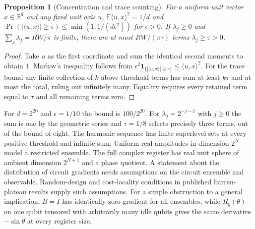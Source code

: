 \documentclass[aps,pra,onecolumn,superscriptaddress,nofootinbib,10pt]{revtex4-2}
\newtheorem{proposition}[theorem]{Proposition}
\theoremstyle{definition}
\theoremstyle{remark}
\begin{document}
\begin{proposition}[Concentration and trace counting]\label{cp:concentration}
For a uniform unit vector $x\in\mathbb R^d$ and any fixed unit axis $u$, $\mathbb E\langle u,x\rangle^2=1/d$ and $\Pr(|\langle u,x\rangle|\ge\epsilon)\le\min(1,1/(d\epsilon^2))$ for $\epsilon>0$. If $\lambda_j\ge0$ and $\sum_j\lambda_j=RW/\pi$ is finite, there are at most $RW/(\pi\tau)$ terms $\lambda_j\ge\tau>0$.
\end{proposition}
\begin{proof}
Take $u$ as the first coordinate and sum the identical second moments to obtain $1$. Markov's inequality follows from $\epsilon^2\mathbf1_{\{|\langle u,x\rangle|\ge\epsilon\}}\le\langle u,x\rangle^2$. For the trace bound any finite collection of $k$ above-threshold terms has sum at least $k\tau$ and at most the total, ruling out infinitely many. Equality requires every retained term equal to $\tau$ and all remaining terms zero.
\end{proof}

For $d=2^{20}$ and $\epsilon=1/10$ the bound is $100/2^{20}$. For $\lambda_j=2^{-j-1}$ with $j\ge0$ the sum is one by the geometric series and $\tau=1/8$ selects precisely three terms, out of the bound of eight. The harmonic sequence has finite superlevel sets at every positive threshold and infinite sum. Uniform real amplitudes in dimension $2^N$ model a restricted ensemble. The full complex register has real unit sphere of ambient dimension $2^{N+1}$ and a phase quotient. A statement about the distribution of circuit gradients needs assumptions on the circuit ensemble and observable. Random-design and cost-locality conditions in published barren-plateau results supply such assumptions. For a simple obstruction to a general implication, $B=I$ has identically zero gradient for all ensembles, while $R_y(\theta)$ on one qubit tensored with arbitrarily many idle qubits gives the same derivative $-\sin\theta$ at every register size. \cite{n5-barren,n5-localcost}
\end{document}
